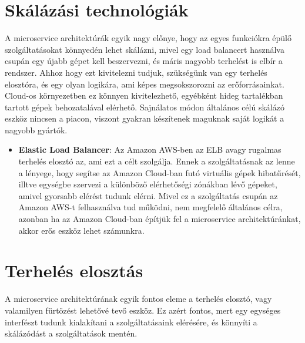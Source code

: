 \documentclass[11pt,magyar,a4paper,oneside,]{report}
\providecommand{\tightlist}{%
  \setlength{\itemsep}{0pt}\setlength{\parskip}{0pt}}
\begin{document}
\section{Skálázási
technológiák}\label{skuxe1luxe1zuxe1si-technoluxf3giuxe1k}

A microservice architektúrák egyik nagy előnye, hogy az egyes funkciókra
épülő szolgáltatásokat könnyedén lehet skálázni, mivel egy load
balancert használva csupán egy újabb gépet kell beszervezni, és máris
nagyobb terhelést is elbír a rendszer. Ahhoz hogy ezt kivitelezni
tudjuk, szükségünk van egy terhelés elosztóra, és egy olyan logikára,
ami képes megsokszorozni az erőforrásainkat. Cloud-os környezetben ez
könnyen kivitelezhető, egyébként hideg tartalékban tartott gépek
behozatalával elérhető. Sajnálatos módon általános célú skálázó eszköz
nincsen a piacon, viszont gyakran készítenek maguknak saját logikát a
nagyobb gyártók.

\begin{itemize}
\tightlist
\item
  \textbf{Elastic Load Balancer}: Az Amazon AWS-ben az ELB avagy
  rugalmas terhelés elosztó az, ami ezt a célt szolgálja. Ennek a
  szolgáltatásnak az lenne a lényege, hogy segítse az Amazon Cloud-ban
  futó virtuális gépek hibatűrését, illtve egységbe szervezi a különböző
  elérhetőségi zónákban lévő gépeket, amivel gyorsabb elérést tudunk
  elérni. Mivel ez a szolgáltatás csupán az Amazon AWS-t felhasználva
  tud működni, nem megfelelő általános célra, azonban ha az Amazon
  Cloud-ban építjük fel a microservice architektúránkat, akkor erős
  eszköz lehet számunkra.
\end{itemize}

\section{Terhelés elosztás}\label{terheluxe9s-elosztuxe1s}

A microservice architektúrának egyik fontos eleme a terhelés elosztó,
vagy valamilyen fürtözést lehetővé tevő eszköz. Ez azért fontos, mert
egy egységes interfészt tudunk kialakítani a szolgáltatásaink elérésére,
és könnyíti a skálázódást a szolgáltatások mentén.
\end{document}
